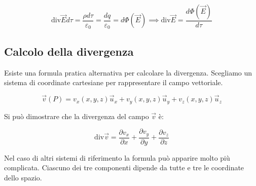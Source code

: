 \[
	\text{div}\vec{E} d\tau =\frac{\rho d\tau}{\varepsilon_0} = \frac{dq}{\varepsilon_0} = d\Phi (\vec{E}) \implies \text{div}\vec{E} = \frac{d\Phi (\vec{E})}{d\tau}
\]

\subsection{Calcolo della divergenza}

Esiste una formula pratica alternativa per calcolare la divergenza. Scegliamo un sistema di coordinate cartesiane per rappresentare il campo vettoriale.

\[
	\vec{v}(P) = v_x(x,y,z)\vec{u}_x + v_y(x,y,z)\vec{u}_y + v_z(x,y,z)\vec{u}_z
\]

Si può dimostrare che la divergenza del campo $\vec{v}$ è:

\[
	\text{div}\vec{v} = \frac{\partial v_x}{\partial x} + \frac{\partial v_y}{\partial y} + \frac{\partial v_z}{\partial z}
\]

Nel caso di altri sistemi di riferimento la formula può apparire molto più complicata. Ciascuno dei tre componenti dipende da tutte e tre le coordinate dello spazio.

